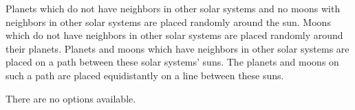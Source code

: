\documentclass{tufte-handout}
\begin{document}
  Planets which do not have neighbors in other solar systems and no moons with
  neighbors in other solar systems are placed randomly around the sun. Moons
  which do not have neighbors in other solar systems are placed randomly around
  their planets. Planets and moons which have neighbors in other solar systems
  are placed on a path between these solar systems’ suns. The planets and moons
  on such a path are placed equidistantly on a line between these suns.

  There are no options available.
  
\end{document}
